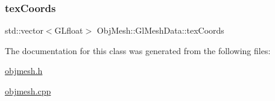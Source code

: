 \mbox{\label{class_obj_mesh_1_1_gl_mesh_data_a0a863da25802937a9d49df3b747d7680}} 
\subsubsection{\texorpdfstring{texCoords}{texCoords}}
{\footnotesize\ttfamily std\+::vector$<$G\+Lfloat$>$ Obj\+Mesh\+::\+Gl\+Mesh\+Data\+::tex\+Coords}



The documentation for this class was generated from the following files\+:\begin{DoxyCompactItemize}
\item 
\mbox{\hyperlink{objmesh_8h}{objmesh.\+h}}\item 
\mbox{\hyperlink{objmesh_8cpp}{objmesh.\+cpp}}\end{DoxyCompactItemize}
